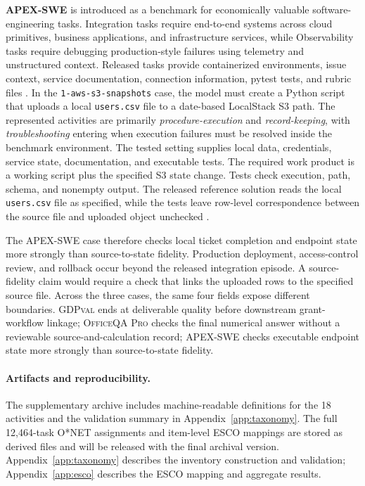 \documentclass[10pt]{article}
\begin{document}
\textbf{\textsc{APEX-SWE}} is introduced as a benchmark for economically valuable software-engineering tasks. Integration tasks require end-to-end systems across cloud primitives, business applications, and infrastructure services, while Observability tasks require debugging production-style failures using telemetry and unstructured context. Released tasks provide containerized environments, issue context, service documentation, connection information, pytest tests, and rubric files \citep{kottamasu2026apex}. In the \texttt{1-aws-s3-snapshots} case, the model must create a Python script that uploads a local \texttt{users.csv} file to a date-based LocalStack S3 path. The represented activities are primarily \emph{procedure-execution} and \emph{record-keeping}, with \emph{troubleshooting} entering when execution failures must be resolved inside the benchmark environment. The tested setting supplies local data, credentials, service state, documentation, and executable tests. The required work product is a working script plus the specified S3 state change. Tests check execution, path, schema, and nonempty output. The released reference solution reads the local \texttt{users.csv} file as specified, while the tests leave row-level correspondence between the source file and uploaded object unchecked \citep{mercor2026apexs3}.

The APEX-SWE case therefore checks local ticket completion and endpoint state more strongly than source-to-state fidelity. Production deployment, access-control review, and rollback occur beyond the released integration episode. A source-fidelity claim would require a check that links the uploaded rows to the specified source file. Across the three cases, the same four fields expose different boundaries. \textsc{GDPval} ends at deliverable quality before downstream grant-workflow linkage; \textsc{OfficeQA Pro} checks the final numerical answer without a reviewable source-and-calculation record; \textsc{APEX-SWE} checks executable endpoint state more strongly than source-to-state fidelity.

\paragraph{Artifacts and reproducibility.}
The supplementary archive includes machine-readable definitions for the 18 activities and the validation summary in Appendix~\ref{app:taxonomy}. The full 12{,}464-task O{*}NET assignments and item-level ESCO mappings are stored as derived files and will be released with the final archival version. Appendix~\ref{app:taxonomy} describes the inventory construction and validation; Appendix~\ref{app:esco} describes the ESCO mapping and aggregate results.
\end{document}
